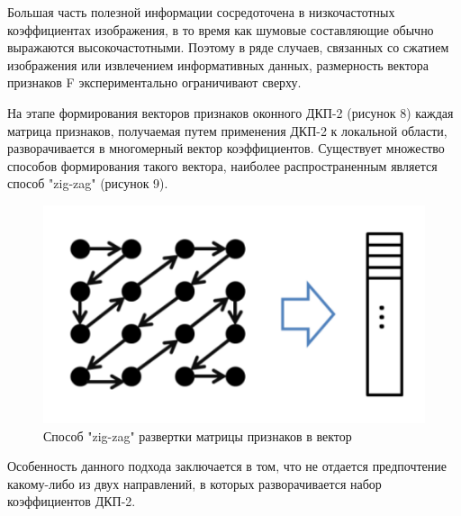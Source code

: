 Большая часть полезной информации сосредоточена в низкочастотных коэффициентах изображения, в то время как шумовые составляющие обычно выражаются высокочастотными. Поэтому в ряде случаев, связанных со сжатием изображения или извлечением информативных данных, размерность вектора признаков F экспериментально ограничивают сверху.

На этапе формирования векторов признаков оконного ДКП-2 (рисунок 8) каждая матрица признаков, получаемая путем применения ДКП-2 к локальной области, разворачивается в многомерный вектор коэффициентов. Существует множество способов формирования такого вектора, наиболее распространенным является способ "zig-zag" (рисунок 9).

\begin{figure}[h!]
\centering
\includegraphics[scale=0.45]{res/pic009}
\caption{Способ "zig-zag" развертки матрицы признаков в вектор}
\end{figure}

\newpage
Особенность данного подхода заключается в том, что не отдается предпочтение какому-либо из двух направлений, в которых разворачивается набор коэффициентов ДКП-2.